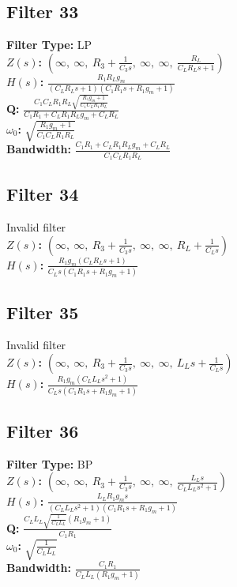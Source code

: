 \documentclass{article}
\begin{document}
\subsection*{Filter 33}
\textbf{Filter Type:} LP \\ 
\textbf{$Z(s)$:} $\left( \infty, \  \infty, \  R_{3} + \frac{1}{C_{3} s}, \  \infty, \  \infty, \  \frac{R_{L}}{C_{L} R_{L} s + 1}\right)$ \\ 
\textbf{$H(s)$:} $\frac{R_{1} R_{L} g_{m}}{\left(C_{L} R_{L} s + 1\right) \left(C_{1} R_{1} s + R_{1} g_{m} + 1\right)}$ \\ 
\textbf{Q:} $\frac{C_{1} C_{L} R_{1} R_{L} \sqrt{\frac{R_{1} g_{m} + 1}{C_{1} C_{L} R_{1} R_{L}}}}{C_{1} R_{1} + C_{L} R_{1} R_{L} g_{m} + C_{L} R_{L}}$ \\ 
\textbf{$\omega_0$:} $\sqrt{\frac{R_{1} g_{m} + 1}{C_{1} C_{L} R_{1} R_{L}}}$ \\ 
\textbf{Bandwidth:} $\frac{C_{1} R_{1} + C_{L} R_{1} R_{L} g_{m} + C_{L} R_{L}}{C_{1} C_{L} R_{1} R_{L}}$ \\ 
\subsection*{Filter 34}
Invalid filter \\ 
\textbf{$Z(s)$:} $\left( \infty, \  \infty, \  R_{3} + \frac{1}{C_{3} s}, \  \infty, \  \infty, \  R_{L} + \frac{1}{C_{L} s}\right)$ \\ 
\textbf{$H(s)$:} $\frac{R_{1} g_{m} \left(C_{L} R_{L} s + 1\right)}{C_{L} s \left(C_{1} R_{1} s + R_{1} g_{m} + 1\right)}$ \\ 
\subsection*{Filter 35}
Invalid filter \\ 
\textbf{$Z(s)$:} $\left( \infty, \  \infty, \  R_{3} + \frac{1}{C_{3} s}, \  \infty, \  \infty, \  L_{L} s + \frac{1}{C_{L} s}\right)$ \\ 
\textbf{$H(s)$:} $\frac{R_{1} g_{m} \left(C_{L} L_{L} s^{2} + 1\right)}{C_{L} s \left(C_{1} R_{1} s + R_{1} g_{m} + 1\right)}$ \\ 
\subsection*{Filter 36}
\textbf{Filter Type:} BP \\ 
\textbf{$Z(s)$:} $\left( \infty, \  \infty, \  R_{3} + \frac{1}{C_{3} s}, \  \infty, \  \infty, \  \frac{L_{L} s}{C_{L} L_{L} s^{2} + 1}\right)$ \\ 
\textbf{$H(s)$:} $\frac{L_{L} R_{1} g_{m} s}{\left(C_{L} L_{L} s^{2} + 1\right) \left(C_{1} R_{1} s + R_{1} g_{m} + 1\right)}$ \\ 
\textbf{Q:} $\frac{C_{L} L_{L} \sqrt{\frac{1}{C_{L} L_{L}}} \left(R_{1} g_{m} + 1\right)}{C_{1} R_{1}}$ \\ 
\textbf{$\omega_0$:} $\sqrt{\frac{1}{C_{L} L_{L}}}$ \\ 
\textbf{Bandwidth:} $\frac{C_{1} R_{1}}{C_{L} L_{L} \left(R_{1} g_{m} + 1\right)}$ \\ 
\end{document}
